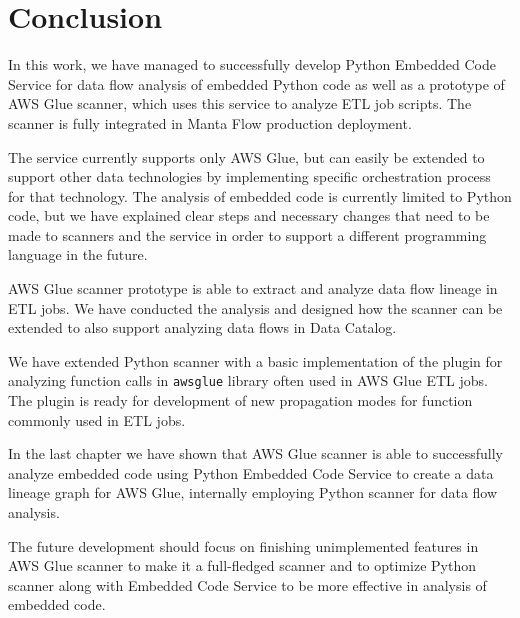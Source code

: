 \chapter{Conclusion}

In this work, we have managed to successfully develop Python Embedded Code Service for data flow analysis of embedded Python code as well as a prototype of AWS Glue scanner, which uses this service to analyze ETL job scripts. The scanner is fully integrated in Manta Flow production deployment.
\par
The service currently supports only AWS Glue, but can easily be extended to support other data technologies by implementing specific orchestration process for that technology. The analysis of embedded code is currently limited to Python code, but we have explained clear steps and necessary changes that need to be made to scanners and the service in order to support a different programming language in the future.
\par
AWS Glue scanner prototype is able to extract and analyze data flow lineage in ETL jobs. We have conducted the analysis and designed how the scanner can be extended to also support analyzing data flows in Data Catalog.
\par
We have extended Python scanner with a basic implementation of the plugin for analyzing function calls in \texttt{awsglue} library often used in AWS Glue ETL jobs. The plugin is ready for development of new propagation modes for function commonly used in ETL jobs.
\par
In the last chapter we have shown that AWS Glue scanner is able to successfully analyze embedded code using Python Embedded Code Service to create a data lineage graph for AWS Glue, internally employing Python scanner for data flow analysis.
\par
The future development should focus on finishing unimplemented features in AWS Glue scanner to make it a full-fledged scanner and to optimize Python scanner along with Embedded Code Service to be more effective in analysis of embedded code.
